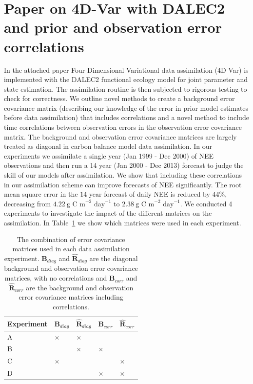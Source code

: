 \documentclass[11pt]{article}
\begin{document}
\section{Paper on 4D-Var with DALEC2 and prior and observation error correlations}

In the attached paper Four-Dimensional Variational data assimilation (4D-Var) is implemented with the DALEC2 functional ecology model for joint parameter and state estimation. The assimilation routine is then subjected to rigorous testing to check for correctness. We outline novel methods to create a background error covariance matrix (describing our knowledge of the error in prior model estimates before data assimilation) that includes correlations and a novel method to include time correlations between observation errors in the observation error covariance matrix. The background and observation error covariance matrices are largely treated as diagonal in carbon balance model data assimilation. In our experiments we assimilate a single year (Jan 1999 - Dec 2000) of NEE observations and then run a 14 year (Jan 2000 - Dec 2013) forecast to judge the skill of our models after assimilation. We show that including these correlations in our assimilation scheme can improve forecasts of NEE significantly. The root mean square error in the $14$ year forecast of daily NEE is reduced by $44\%$, decreasing from $4.22~\text{g C m}^{-2}\text{ day}^{-1}$ to $2.38~\text{g C m}^{-2}\text{ day}^{-1}$. We conducted 4 experiments to investigate the impact of the different matrices on the assimilation. In Table~\ref{table:exps_tab} we show which matrices were used in each experiment. 

\begin{table}[ht] 
\begin{center}
	\begin{tabular}{| l | l | l | l | l |}
	\hline
	Experiment & $\textbf{B}_{diag}$ & $\hat{\mathbf{R}}_{diag}$ & $\textbf{B}_{corr}$ &
	$\hat{\mathbf{R}}_{corr}$ \\ \hline
	A & $\times$ & $\times$ & & \\ \hline
	B & & $\times$ & $\times$ & \\ \hline
	C & $\times$ & & & $\times$ \\ \hline
	D & & & $\times$ & $\times$ \\ 
	\hline
	\end{tabular}
	\caption{The combination of error covariance matrices used in each data assimilation experiment. $\textbf{B}_{diag}$ and $\hat{\mathbf{R}}_{diag}$ are the diagonal background and observation error covariance matrices, with no correlations and $\textbf{B}_{corr}$ and $\hat{\mathbf{R}}_{corr}$ are the background and observation error covariance matrices including correlations.}
	\label{table:exps_tab}
\end{center} 
\end{table}
\end{document}
